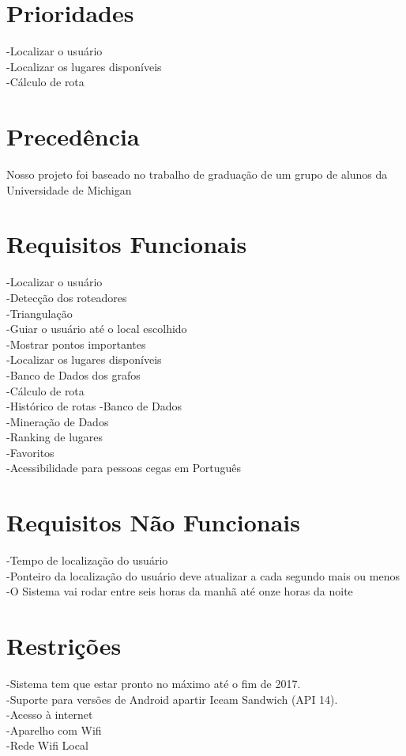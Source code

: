 \documentclass[12pt]{article}
\begin{document}
\section*{Prioridades}
-Localizar o usuário\\
-Localizar os lugares disponíveis\\
-Cálculo de rota\\
\section*{Precedência}
Nosso projeto foi baseado no trabalho de graduação de um grupo de alunos da Universidade de Michigan
\section*{Requisitos Funcionais}
-Localizar o usuário\\
	-Detecção dos roteadores\\ 	
	-Triangulação\\
-Guiar o usuário até o local escolhido\\
-Mostrar pontos importantes\\
-Localizar os lugares disponíveis\\
	-Banco de Dados dos grafos\\
-Cálculo de rota\\
-Histórico de rotas
	-Banco de Dados\\
	-Mineração de Dados\\
-Ranking de lugares\\
-Favoritos\\
-Acessibilidade para pessoas cegas em Português\\

\section*{Requisitos Não Funcionais}
-Tempo de localização do usuário\\
-Ponteiro da localização do usuário deve atualizar a cada segundo mais ou menos\\
-O Sistema vai rodar entre seis horas da manhã até onze horas da noite\\

\section*{Restrições}
-Sistema tem que estar pronto no máximo até o fim de 2017.\\
-Suporte para versões de Android apartir Iceam Sandwich (API 14)\cite{androidVersion}.\\
-Acesso à internet \\
-Aparelho com Wifi\\
-Rede Wifi Local\\
\end{document}
